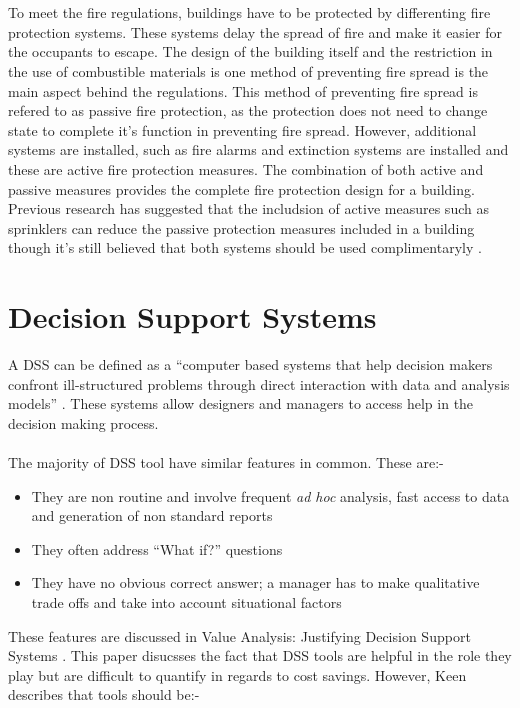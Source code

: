 \documentclass[table,a4paper,oneside]{book}
\begin{document}
\\
\\
To meet the fire regulations, buildings have to be protected by differenting fire protection systems. These systems delay the spread of fire and make it easier for the occupants to escape. The design of the building itself and the restriction in the use of combustible materials is one method of preventing fire spread is the main aspect behind the regulations. This method of preventing fire spread is refered to as passive fire protection, as the protection does not need to change state to complete it's function in preventing fire spread. However, additional systems are installed, such as fire alarms and extinction systems are installed and these are active fire protection measures. The combination of both active and passive measures provides the complete fire protection design for a building. Previous research has suggested that the includsion of active measures such as sprinklers can reduce the passive protection measures included in a building \citep{Baldwin1974} though it's still believed that both systems should be used complimentaryly \citep{Haack2004}.

\section{Decision Support Systems}
\label{sec:DSS}
A \ac{DSS} can be defined as a ``computer based systems that help decision makers confront ill-structured problems through direct interaction with data and analysis models'' \citep{SpragueWatson198906}. These systems allow designers and managers to access help in the decision making process.
\\
\\
The majority of \ac{DSS} tool have similar features in common. These are:-
\begin{itemize}
\item They are non routine and involve frequent \emph{ad hoc} analysis, fast access to data and generation of non standard reports
\item They often address ``What if?'' questions
\item They have no obvious correct answer; a manager has to make qualitative trade offs and take into account situational factors
\end{itemize}

These features are discussed in Value Analysis: Justifying Decision Support Systems \citep{Keen1981}. This paper disucsses the fact that \ac{DSS} tools are helpful in the role they play but are difficult to quantify in regards to cost savings. However, Keen describes that tools should be:-
\end{document}

